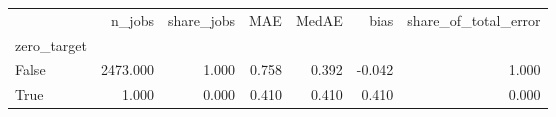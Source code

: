 \begin{tabular}{lrrrrrr}
\toprule
 & n_jobs & share_jobs & MAE & MedAE & bias & share_of_total_error \\
zero_target &  &  &  &  &  &  \\
\midrule
False & 2473.000 & 1.000 & 0.758 & 0.392 & -0.042 & 1.000 \\
True & 1.000 & 0.000 & 0.410 & 0.410 & 0.410 & 0.000 \\
\bottomrule
\end{tabular}

